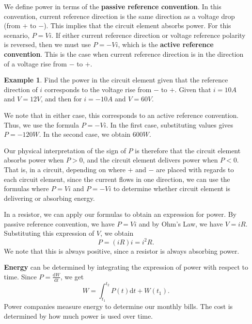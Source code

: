 \documentclass[11pt]{article}
\theoremstyle{plain} %
\theoremstyle{definition}
\theoremstyle{example}
\newtheorem*{example}{Example}
\theoremstyle{remark}
\begin{document}
We define power in terms of the \textbf{passive reference convention}. In this convention, current reference direction is the same direction as a voltage drop (from $+$ to $-$). This implies that the circuit element absorbs power. For this scenario, $P = Vi$. If either current reference direction or voltage reference polarity is reversed, then we must use $P = -Vi$, which is the \textbf{active reference convention}. This is the case when current reference direction is in the direction of a voltage rise from $-$ to $+$. 

\begin{example}
Find the power in the circuit element given that the reference direction of $i$ corresponds to the voltage rise from $-$ to $+$. Given that $i = 10A$ and $V=12V$, and then for $i = -10A$ and $V = 60V$.
\end{example}

We note that in either case, this corresponds to an active reference convention. Thus, we use the formula $P = -Vi$. In the first case, substituting values gives $P = -120W$. In the second case, we obtain $600W$. 

Our physical interpretation of the sign of $P$ is therefore that the circuit element absorbs power when $P > 0$, and the circuit element delivers power when $P < 0$. That is, in a circuit, depending on where $+$ and $-$ are placed with regards to each circuit element, since the current flows in one direction, we can use the formulas where $P = Vi$ and $P = -Vi$ to determine whether circuit element is delivering or absorbing energy. 

In a resistor, we can apply our formulas to obtain an expression for power. By passive reference convention, we have $P = Vi$ and by Ohm's Law, we have $V = iR$. Substituting this expression of $V$, we obtain 
$$P = (iR)i = i^2R.$$
We note that this is always positive, since a resistor is always absorbing power. 

\textbf{Energy} can be determined by integrating the expression of power with respect to time. Since $P = \frac{\mathrm d W}{\mathrm d t}$, we get
$$W = \int_{t_1}^{t_2}P(t)\mathrm d t + W(t_1).$$
Power companies measure energy to determine our monthly bills. The cost is determined by how much power is used over time. 
\end{document}
